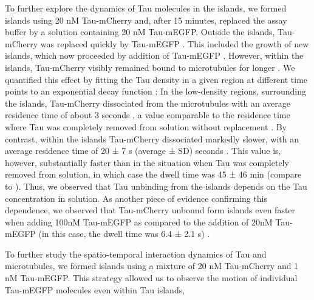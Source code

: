 To further explore the dynamics of Tau molecules in the islands, we formed islands using 20 nM Tau-mCherry and, after 15 minutes, replaced the assay buffer by a solution containing 20 nM Tau-mEGFP. Outside the islands, Tau-mCherry was replaced quickly by Tau-mEGFP . This included the growth of new islands, which now proceeded by addition of Tau-mEGFP . However, within the islands, Tau-mCherry visibly remained bound to microtubules for longer . We quantified this effect by fitting the Tau density in a given region at different time points to an exponential decay function : In the low-density regions, surrounding the islands, Tau-mCherry dissociated from the microtubules with an average residence time of about 3 seconds , a value comparable to the residence time where Tau was completely removed from solution without replacement . By contrast, within the islands Tau-mCherry dissociated markedly slower, with an average residence time of 20 ± 7 s (average ± SD) seconds . This value is, however, substantially faster than in the situation when Tau was completely removed from solution, in which case the dwell time was 45 ± 46 min (compare to ). Thus, we observed that Tau unbinding from the islands depends on the Tau concentration in solution. As another piece of evidence confirming this dependence, we observed that Tau-mCherry unbound form islands even faster when adding 100nM Tau-mEGFP as compared to the addition of 20nM Tau-mEGFP (in this case, the dwell time was 6.4 ± 2.1 s) .\par

To further study the spatio-temporal interaction dynamics of Tau and microtubules, we formed islands using a mixture of 20 nM Tau-mCherry and 1 nM Tau-mEGFP. This strategy allowed us to observe the motion of individual Tau-mEGFP molecules even within Tau islands, 

